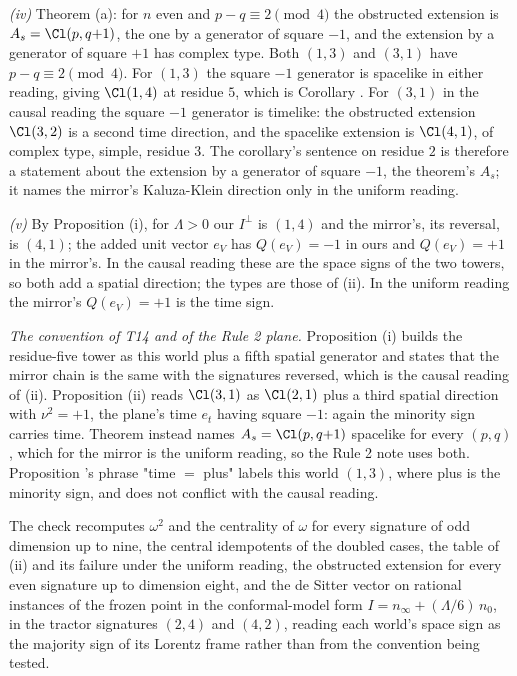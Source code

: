\emph{(iv)} Theorem (a): for $n$ even and $p - q \equiv 2 \pmod 4$ the obstructed extension is $A_{s} = \Cl(p, q{+}1)$, the one by a generator of square $-1$, and the extension by a generator of square $+1$ has complex type. Both $(1,3)$ and $(3,1)$ have $p - q \equiv 2 \pmod 4$. For $(1,3)$ the square $-1$ generator is spacelike in either reading, giving $\Cl(1,4)$ at residue $5$, which is Corollary . For $(3,1)$ in the causal reading the square $-1$ generator is timelike: the obstructed extension $\Cl(3,2)$ is a second time direction, and the spacelike extension is $\Cl(4,1)$, of complex type, simple, residue $3$. The corollary's sentence on residue $2$ is therefore a statement about the extension by a generator of square $-1$, the theorem's $A_{s}$; it names the mirror's Kaluza-Klein direction only in the uniform reading.

\emph{(v)} By Proposition (i), for $\Lambda > 0$ our $I^{\perp}$ is $(1,4)$ and the mirror's, its reversal, is $(4,1)$; the added unit vector $e_{V}$ has $Q(e_{V}) = -1$ in ours and $Q(e_{V}) = +1$ in the mirror's. In the causal reading these are the space signs of the two towers, so both add a spatial direction; the types are those of (ii). In the uniform reading the mirror's $Q(e_{V}) = +1$ is the time sign.

\emph{The convention of T14 and of the Rule 2 plane.}  Proposition (i) builds the residue-five tower as this world plus a fifth spatial generator and states that the mirror chain is the same with the signatures reversed, which is the causal reading of (ii). Proposition (ii) reads $\Cl(3,1)$ as $\Cl(2,1)$ plus a third spatial direction with $\nu^{2} = +1$, the plane's time $e_{t}$ having square $-1$: again the minority sign carries time. Theorem  instead names $A_{s} = \Cl(p,q{+}1)$ spacelike for every $(p,q)$, which for the mirror is the uniform reading, so the Rule 2 note uses both. Proposition 's phrase "time $=$ plus" labels this world $(1,3)$, where plus is the minority sign, and does not conflict with the causal reading.

The check recomputes $\omega^{2}$ and the centrality of $\omega$ for every signature of odd dimension up to nine, the central idempotents of the doubled cases, the table of (ii) and its failure under the uniform reading, the obstructed extension for every even signature up to dimension eight, and the de Sitter vector on rational instances of the frozen point in the conformal-model form $I = n_{\infty} + (\Lambda/6)\,n_{0}$, in the tractor signatures $(2,4)$ and $(4,2)$, reading each world's space sign as the majority sign of its Lorentz frame rather than from the convention being tested.
